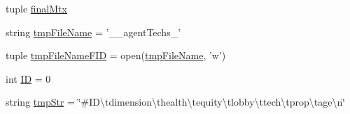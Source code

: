 \begin{DoxyCompactItemize}
\item 
tuple \hyperlink{namespacea__agentstechs_characterization_a85384f68fcde2dc6b1b397c7629859fc}{final\-Mtx}
\item 
string \hyperlink{namespacea__agentstechs_characterization_a06dabcb3460c501f3e8feb1c31b84b53}{tmp\-File\-Name} = '\-\_\-\-\_\-agent\-Techs\-\_\-'
\item 
tuple \hyperlink{namespacea__agentstechs_characterization_a15f3dec33abf61c3895a39228a777b9a}{tmp\-File\-Name\-F\-I\-D} = open(\hyperlink{namespacea__agentstechs_characterization_a06dabcb3460c501f3e8feb1c31b84b53}{tmp\-File\-Name}, 'w')
\item 
int \hyperlink{namespacea__agentstechs_characterization_a10c3f0b49c4782984d036f57c540b5eb}{I\-D} = 0
\item 
string \hyperlink{namespacea__agentstechs_characterization_afb29d4e5f94938bd1ef3c634c6207bd7}{tmp\-Str} = \char`\"{}\#I\-D\textbackslash{}tdimension\textbackslash{}thealth\textbackslash{}tequity\textbackslash{}tlobby\textbackslash{}ttech\textbackslash{}tprop\textbackslash{}tage\textbackslash{}n\char`\"{}
\end{DoxyCompactItemize}


